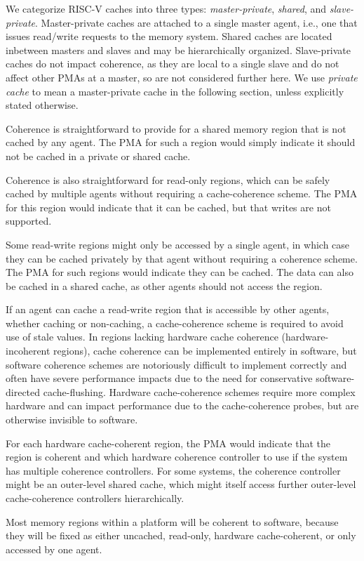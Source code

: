 \begin{commentary}
We categorize RISC-V caches into three types: {\em master-private},
{\em shared}, and {\em slave-private}.  Master-private caches are
attached to a single master agent, i.e., one that issues read/write
requests to the memory system.  Shared caches are located inbetween
masters and slaves and may be hierarchically organized.  Slave-private
caches do not impact coherence, as they are local to a single slave
and do not affect other PMAs at a master, so are not considered
further here.  We use {\em private cache} to mean a master-private
cache in the following section, unless explicitly stated otherwise.

Coherence is straightforward to provide for a shared memory region
that is not cached by any agent.  The PMA for such a region would
simply indicate it should not be cached in a private or shared cache.

Coherence is also straightforward for read-only regions, which can be
safely cached by multiple agents without requiring a cache-coherence
scheme.  The PMA for this region would indicate that it can be cached,
but that writes are not supported.

Some read-write regions might only be accessed by a single agent, in
which case they can be cached privately by that agent without
requiring a coherence scheme.  The PMA for such regions would indicate
they can be cached.  The data can also be cached in a shared cache, as
other agents should not access the region.

If an agent can cache a read-write region that is accessible by other
agents, whether caching or non-caching, a cache-coherence scheme is
required to avoid use of stale values.  In regions lacking hardware
cache coherence (hardware-incoherent regions), cache coherence can be
implemented entirely in software, but software coherence schemes are
notoriously difficult to implement correctly and often have severe
performance impacts due to the need for conservative software-directed
cache-flushing.  Hardware cache-coherence schemes require more complex
hardware and can impact performance due to the cache-coherence probes,
but are otherwise invisible to software.

For each hardware cache-coherent region, the PMA would indicate that
the region is coherent and which hardware coherence controller to use
if the system has multiple coherence controllers.  For some systems,
the coherence controller might be an outer-level shared cache, which
might itself access further outer-level cache-coherence controllers
hierarchically.

Most memory regions within a platform will be coherent to software,
because they will be fixed as either uncached, read-only, hardware
cache-coherent, or only accessed by one agent.
\end{commentary}

